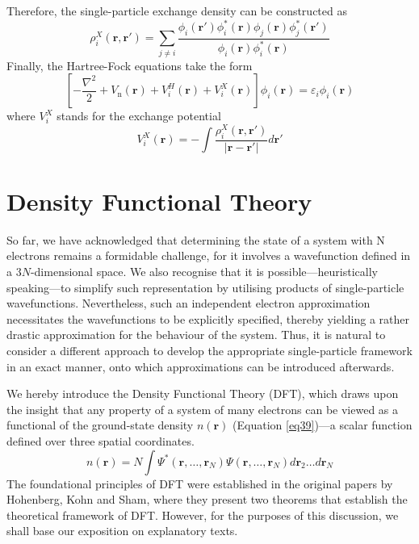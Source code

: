 Therefore, the single-particle exchange density can be constructed as 
\begin{equation}
  \label{eq36}
  \rho^X_i(\mathbf{r}, \mathbf{r'}) = \sum_{j\neq i}\frac{\phi_i(\mathbf{r'})\phi^*_i(\mathbf{r})\phi_j(\mathbf{r})\phi^*_j(\mathbf{r'})}{\phi_i(\mathbf{r})\phi^*_i(\mathbf{r})}
\end{equation}
Finally, the Hartree-Fock equations take the form 
\begin{equation}
  \label{eq37}
  \left[-\frac{\nabla^2}{2} + V_{\text{n}}(\mathbf{r}) + V^H_i(\mathbf{r}) + V^X_i(\mathbf{r})\right]\phi_i(\mathbf{r}) = \varepsilon_i \phi_i(\mathbf{r})
\end{equation}
where $V^X_i$ stands for the exchange potential
\begin{equation}
  \label{eq38}
  V^X_i(\mathbf{r}) = -\int \frac{\rho^X_i(\mathbf{r}, \mathbf{r'})}{|\mathbf{r} - \mathbf{r'}|} d\mathbf{r'}
\end{equation}

\section{Density Functional Theory}
So far, we have acknowledged that determining the state of a system with N electrons remains a formidable challenge, for it involves a wavefunction defined in a $3N$-dimensional space. We also recognise that it is possible---heuristically speaking---to simplify such representation by utilising products of single-particle wavefunctions. Nevertheless, such an independent electron approximation necessitates the wavefunctions to be explicitly specified, thereby yielding a rather drastic approximation for the behaviour of the system. Thus, it is natural to consider a different approach to develop the appropriate single-particle framework in an exact manner, onto which approximations can be introduced afterwards.

We hereby introduce the Density Functional Theory (DFT), which draws upon the insight that any property of a system of many electrons can be viewed as a functional of the ground-state density $n(\mathbf{r})$\supercite{martin2020electronic} (Equation \ref{eq39})---a scalar function defined over three spatial coordinates. 
\begin{equation}
  n(\mathbf{r}) = N \int \Psi^*(\mathbf{r}, \ldots, \mathbf{r}_N) \Psi(\mathbf{r},\ldots, \mathbf{r}_N) d\mathbf{r}_2 \ldots d\mathbf{r}_N
  \label{eq39}
\end{equation}
The foundational principles of DFT were established in the original papers by Hohenberg, Kohn and Sham\supercite{Hohenberg1964, Kohn1965}, where they present two theorems that establish the theoretical framework of DFT.
However, for the purposes of this discussion, we shall base our exposition on explanatory texts\supercite{martin2020electronic, giustino2014materials, kaxiras2003atomic, sholl2023density}.


